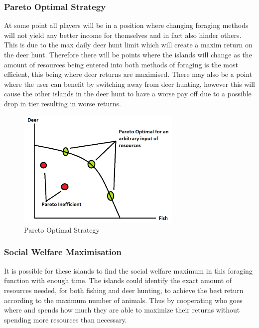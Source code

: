\subsubsection{Pareto Optimal Strategy}

At some point all players will be in a position where changing foraging methods will not yield any better income for themselves and in fact also hinder others. This is due to the max daily deer hunt limit which will create a maxim return on the deer hunt. Therefore there will be points where the islands will change as the amount of resources being entered into both methods of foraging is the most efficient, this being where deer returns are maximised. There may also be a point where the user can benefit by switching away from deer hunting, however this will cause the other islands in the deer hunt to have a worse pay off due to a possible drop in tier resulting in worse returns.

\begin{figure}[!htb]
    \centering
    \includegraphics[width=0.7\textwidth]{04_environment/Images/Pareto Optimal Strategy.PNG}
    \caption{Pareto Optimal Strategy}
    \label{fig:Pareto Optimal Strategy}
\end{figure}

\subsubsection{Social Welfare Maximisation}

It is possible for these islands to find the social welfare maximum in this foraging function with enough time. The islands could identify the exact amount of resources needed, for both fishing and deer hunting, to achieve the best return according to the maximum number of animals. Thus by cooperating who goes where and spends how much they are able to maximize their returns without spending more resources than necessary.

